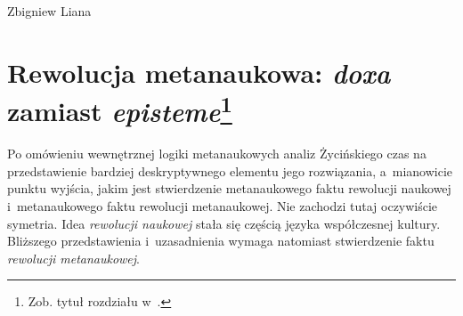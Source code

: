 \begin{artplenv}{Zbigniew Liana}
\section[Rewolucja metanaukowa: \textit{doxa} zamiast \textit{episteme}]{Rewolucja metanaukowa: \textit{doxa} zamiast \textit{episteme}\footnote{Zob. tytuł rozdziału w~\parencite[s.~101]{zycinski_jezyk_1983}.
	}
}

Po omówieniu wewnętrznej logiki metanaukowych analiz Życińskiego czas na przedstawienie bardziej deskryptywnego elementu
jego rozwiązania, a~mianowicie punktu wyjścia, jakim jest stwierdzenie metanaukowego faktu rewolucji naukowej i~metanaukowego
faktu rewolucji metanaukowej. Nie zachodzi tutaj oczywiście symetria. Idea \textit{rewolucji naukowej}
stała się częścią języka współczesnej kultury. Bliższego przedstawienia i~uzasadnienia wymaga natomiast stwierdzenie
faktu \textit{rewolucji metanaukowej}. 


\end{artplenv}
